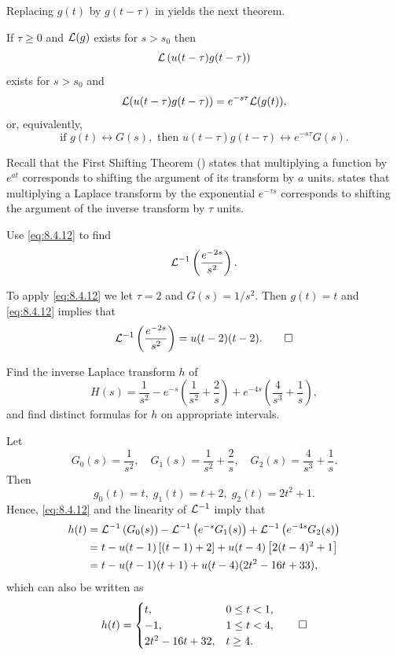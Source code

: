 Replacing $g(t)$ by $g(t-\tau)$ in 
yields the next theorem.

\begin{theorem}\label{thmtype:8.4.2}
If
 $\tau\ge0$ and ${\mathcal L}(g)$ exists for $s>s_0$
then
\[{\mathcal L}\left(u(t-\tau)g(t-\tau)\right)\]
exists for $s>s_0$ and
\[
{\mathcal L}(u(t-\tau)g(t-\tau))=e^{-s\tau}{\mathcal L}(g(t)),
\]
or, equivalently,
\begin{equation}\label{eq:8.4.12}
\text{if } g(t)\leftrightarrow G(s),\text{ then }u(t-\tau)g(t-\tau)
\leftrightarrow e^{-s\tau}G(s).
\end{equation}
\end{theorem}

\begin{remark*}
Recall that the First Shifting Theorem
() states that multiplying a function  by
$e^{at}$ corresponds to shifting the argument of its transform by $a$
units.  states that multiplying a Laplace
transform by the exponential $e^{-\tau s}$ corresponds to shifting the
argument of the inverse transform by $\tau$ units.
\end{remark*}

\begin{example}\label{example:8.4.6}
 Use \eqref{eq:8.4.12} to find
\[
{\mathcal L}^{-1}\left(\frac{e^{-2s}}{s^2}\right).
\]
\end{example}

\begin{solution}
To apply \eqref{eq:8.4.12} we let
$\tau=2$ and $G(s)=1/s^2$. Then $g(t)=t$ and \eqref{eq:8.4.12} implies that
\[
{\mathcal L}^{-1}\left(\frac{e^{-2s}}{s^2}\right)=u(t-2)(t-2).\qedhere
\]
\end{solution}

\begin{example}\label{example:8.4.7}
 Find the inverse Laplace transform $h$ of
\[
H(s)=\frac{1}{s^2}-e^{-s}\left(\frac{1}{s^2}+\frac{2}{s}\right)+
e^{-4s}\left(\frac{4}{s^3}+\frac{1}{s}\right),
\]
and find distinct formulas for $h$ on appropriate intervals.
\end{example}

\begin{solution}
Let
\[
G_0(s)=\frac{1}{s^2},\quad G_1(s)=\frac{1}{s^2}+\frac{2}{s},\quad
G_2(s)=\frac{4}{s^3}+\frac{1}{s}.
\]
Then
\[
g_0(t)=t,\; g_1(t)=t+2,\; g_2(t)=2t^2+1.
\]
Hence, \eqref{eq:8.4.12} and the linearity of ${\mathcal L}^{-1}$ imply that
\begin{align*}
h(t)&={\mathcal L}^{-1}\left(G_0(s)\right)-{\mathcal L}^{-1}\left(e^{-s}G_1(s)\right)+{\mathcal L}^{-1}\left(e^{-4s}G_2(s)\right)\\
&=t-u(t-1)\left[(t-1)+2\right]+u(t-4)\left[2(t-4)^2+1\right]\\
&=t-u(t-1)(t+1)+u(t-4)(2t^2-16t+33),
\end{align*}
which can also be written as
\[
h(t)=\begin{cases}
 t,&0\le t<1,\\
-1,&1\le t<4,\\
2t^2-16t+32,&t\ge4.
\end{cases}\qedhere
\]
\end{solution}

